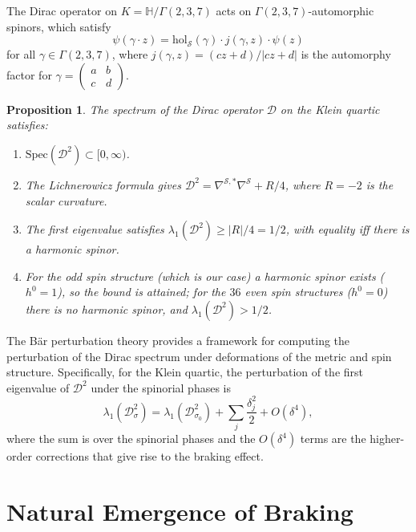\documentclass[12pt,a4paper]{article}
\newtheorem{proposition}[theorem]{Proposition}
\theoremstyle{definition}
\theoremstyle{remark}
\newcommand{\HH}{\mathbb{H}}
\newcommand{\hol}{\mathrm{hol}}
\newcommand{\Spec}{\mathrm{Spec}}
\newcommand{\cD}{\mathcal{D}}
\newcommand{\cS}{\mathcal{S}}
\begin{document}
The Dirac operator on $K = \HH/\Gamma(2,3,7)$ acts on $\Gamma(2,3,7)$-automorphic spinors, which satisfy
\begin{equation}
\psi(\gamma \cdot z) = \hol_{\cS}(\gamma) \cdot j(\gamma, z) \cdot \psi(z)
\end{equation}
for all $\gamma \in \Gamma(2,3,7)$, where $j(\gamma, z) = (cz + d)/|cz + d|$ is the automorphy factor for $\gamma = \begin{pmatrix} a & b \\ c & d \end{pmatrix}$.

\begin{proposition}
The spectrum of the Dirac operator $\cD$ on the Klein quartic satisfies:
\begin{enumerate}[label=(\roman*)]
\item $\Spec(\cD^2) \subset [0, \infty)$.
\item The Lichnerowicz formula gives $\cD^2 = \nabla^{\cS,*}\nabla^{\cS} + R/4$, where $R = -2$ is the scalar curvature.
\item The first eigenvalue satisfies $\lambda_1(\cD^2) \geq |R|/4 = 1/2$, with equality iff there is a harmonic spinor.
\item For the odd spin structure (which is our case) a harmonic spinor exists ($h^0 = 1$), so the bound is attained; for the $36$ even spin structures ($h^0 = 0$) there is no harmonic spinor, and $\lambda_1(\cD^2) > 1/2$.
\end{enumerate}
\end{proposition}

The B\"ar perturbation theory \cite{Baer1992} provides a framework for computing the perturbation of the Dirac spectrum under deformations of the metric and spin structure. Specifically, for the Klein quartic, the perturbation of the first eigenvalue of $\cD^2$ under the spinorial phases is
\begin{equation}
\lambda_1(\cD^2_{\sigma}) = \lambda_1(\cD^2_{\sigma_0}) + \sum_j \frac{\delta_j^2}{2} + O(\delta^4),
\end{equation}
where the sum is over the spinorial phases and the $O(\delta^4)$ terms are the higher-order corrections that give rise to the braking effect.

\section{Natural Emergence of Braking}
\label{sec:braking}
\end{document}
